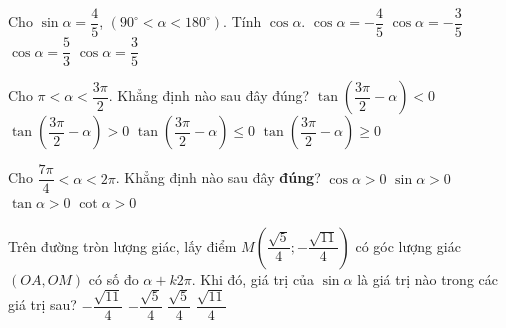 \begin{ex}%
	Cho  $\sin \alpha =\dfrac{4}{5} $, $(90^\circ <\alpha <180^\circ)$. Tính $\cos \alpha $.
	 \choice
		{$\cos  \alpha =-\dfrac{4}{5} $}
		{\True $\cos \alpha =-\dfrac{3}{5} $} 
		{$\cos \alpha =\dfrac{5}{3} $} 
		{$\cos \alpha =\dfrac{3}{5} $} 
\end{ex}

\begin{ex}%
	 Cho $\pi <\alpha <\dfrac{3\pi}{2}$. Khẳng định nào sau đây đúng?
	\choice 
		{$\tan \left(\dfrac{3\pi}{2} -\alpha  \right)<0$}
		{\True  $\tan \left(\dfrac{3\pi}{2} -\alpha \right)>0$}
		{$\tan \left(\dfrac{3\pi}{2} -\alpha  \right)\le 0$}
		{$\tan \left(\dfrac{3\pi}{2} -\alpha \right)\ge  0$}
\end{ex}

\begin{ex}%
	Cho $\dfrac{7\pi}{4} < \alpha < 2\pi$. Khẳng định  nào sau đây \textbf{đúng}?
	\choice 
		{\True $\cos \alpha >  0$}
		{$\sin \alpha > 0$} 
		{$\tan  \alpha > 0$}
		 {$\cot \alpha > 0$}
\end{ex}

\begin{ex}%
	Trên đường  tròn lượng giác, lấy điểm $M\left(\dfrac{\sqrt{5}}{4};-\dfrac{\sqrt{11}}{4} \right)$ có góc lượng giác $(OA, OM)$ có số đo $\alpha+k2\pi$. Khi đó, giá trị của $\sin \alpha$ là giá trị nào trong các giá trị sau?
	 \choice
		 {\True $-\dfrac{\sqrt{11}}{4}$}
		{$-\dfrac{\sqrt{5}}{4}$} 
		 {$\dfrac{\sqrt{5}}{4}$}
		 {$\dfrac{\sqrt{11}}{4}$}
\end{ex}

